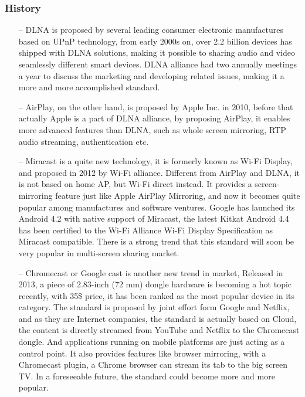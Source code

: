 \subsubsection{History}
\begin{itemize}
\item[--]DLNA is proposed by several leading consumer electronic manufactures based on UPnP 
technology, from early 2000s on, over 2.2 billion devices has shipped with DLNA solutions, 
making it possible to sharing audio and video seamlessly different smart devices. DLNA alliance 
had two annually meetings a year to discuss the marketing and developing related issues, making 
it a more and more accomplished standard.

\item[--]AirPlay, on the other hand, is proposed by Apple Inc. in 2010, before that actually 
Apple is a part of DLNA alliance, by proposing AirPlay, it enables more advanced features than 
DLNA, such as whole screen mirroring, RTP audio streaming, authentication etc.
\item[--]Miracast is a quite new technology, it is formerly known as Wi-Fi Display, and proposed 
in 2012 by Wi-Fi alliance. Different from AirPlay and DLNA, it is not based on home AP, but  
Wi-Fi direct instead. It provides a screen-mirroring feature just like Apple AirPlay Mirroring, 
and now it becomes quite popular among manufactures and software ventures. Google has launched 
its Android 4.2 with native support of Miracast, the latest Kitkat Android 4.4 has been certified 
to the Wi-Fi Alliance Wi-Fi Display Specification as Miracast compatible. There is a strong trend 
that this standard will soon be very popular in multi-screen sharing market.
\item[--]Chromecast or Google cast is another new trend in
market, Released in 2013, a piece of 2.83-inch (72 mm) dongle hardware is
becoming a hot topic recently, with 35\$ price, it has been ranked as the most
popular device in its category. The standard is proposed by joint effort form
Google and Netflix, and as they are Internet companies, the standard is
actually based on Cloud, the content is directly streamed from YouTube and
Netflix to the Chromecast dongle. And applications running on mobile platforms
are just acting as a control point. It also provides features like browser
mirroring, with a Chromecast plugin, a Chrome browser can stream its tab to the
big screen TV. In a foreseeable future, the standard could become more and more popular.
\end{itemize}

